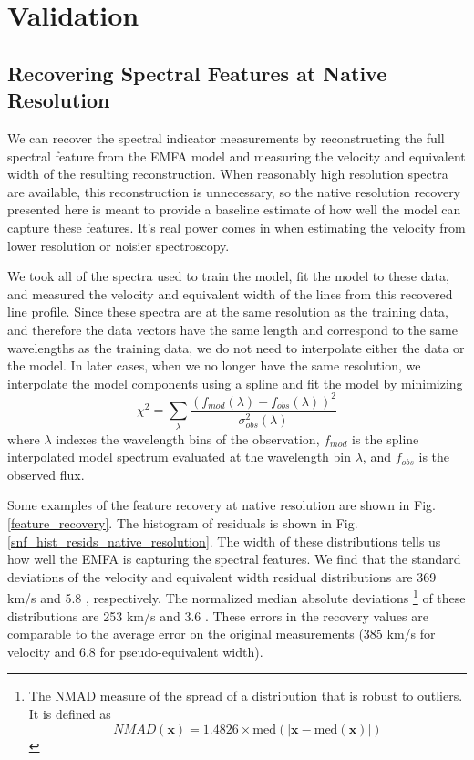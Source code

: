 \section{Validation}
\label{validation}

\subsection{Recovering Spectral Features at Native Resolution}
\label{snf_validation}
We can recover the spectral indicator measurements by reconstructing the full spectral feature from the EMFA model and measuring the velocity and equivalent width of the resulting reconstruction. When reasonably high resolution spectra are available, this reconstruction is unnecessary, so the native resolution recovery presented here is meant to provide a baseline estimate of how well the model can capture these features. It's real power comes in when estimating the velocity from lower resolution or noisier spectroscopy.

We took all of the spectra used to train the model, fit the model to these data, and measured the velocity and equivalent width of the lines from this recovered line profile. Since these spectra are at the same resolution as the training data, and therefore the data vectors have the same length and correspond to the same wavelengths as the training data, we do not need to interpolate either the data or the model. In later cases, when we no longer have the same resolution, we interpolate the model components using a spline and fit the model by minimizing
\begin{equation}
    \chi^2 = \displaystyle\sum_\lambda \frac{(f_{mod}(\lambda)-f_{obs}(\lambda))^2}{\sigma_{obs}^2(\lambda)}
\end{equation}
where $\lambda$ indexes the wavelength bins of the observation, $f_{mod}$ is the spline interpolated model spectrum evaluated at the wavelength bin $\lambda$, and $f_{obs}$ is the observed flux.

Some examples of the feature recovery at native resolution are shown in Fig. \ref{feature_recovery}. The histogram of residuals is shown in Fig. \ref{snf_hist_resids_native_resolution}. The width of these distributions tells us how well the EMFA is capturing the spectral features. We find that the standard deviations of the velocity and equivalent width residual distributions are 369 km/s and 5.8 \angstrom, respectively. The normalized median absolute deviations \footnote{The NMAD measure of the spread of a distribution that is robust to outliers. It is defined as $$NMAD(\mathbf{x}) = 1.4826\times\text{med}(|\mathbf{x}-\text{med}(\mathbf{x})|)$$} of these distributions are 253 km/s and 3.6 \angstrom. These errors in the recovery values are comparable to the average error on the original measurements (385 km/s for velocity and 6.8 \angstrom\; for pseudo-equivalent width). 

